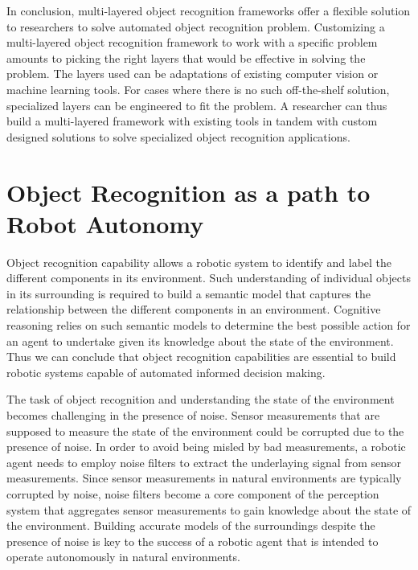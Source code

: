 \documentclass {udthesis}
\begin{document}
In conclusion, multi-layered object recognition frameworks offer a flexible solution to researchers to solve automated object recognition problem. Customizing a multi-layered object recognition framework to work with a specific problem amounts to picking the right layers that would be effective in solving the problem. The layers used can be adaptations of existing computer vision or machine learning tools. For cases where there is no such off-the-shelf solution, specialized layers can be engineered to fit the problem. A researcher can thus build a multi-layered framework with existing tools in tandem with custom designed solutions to solve specialized object recognition applications.

\section{Object Recognition as a path to Robot Autonomy}

Object recognition capability allows a robotic system to identify and label the different components in its environment. Such understanding of individual objects in its surrounding is required to build a semantic model that captures the relationship between the different components in an environment.
Cognitive reasoning relies on such semantic models to determine the best possible action for an agent to undertake given its knowledge about the state of the environment. Thus we can conclude that object recognition capabilities are essential to build robotic systems capable of automated informed decision making.

The task of object recognition and understanding the state of the environment becomes challenging in the presence of noise. Sensor measurements
that are supposed to measure the state of the environment could be corrupted due to the presence of noise. In order to avoid being misled by bad measurements,
a robotic agent needs to employ noise filters to extract the underlaying signal from sensor measurements. Since sensor measurements in natural environments are typically corrupted by noise, noise filters become a core component of the perception system that aggregates sensor measurements to gain knowledge about the state of the environment. Building accurate models of the surroundings despite the presence of noise is key to the success of a robotic agent that is intended to operate autonomously in natural environments.
\end{document}
